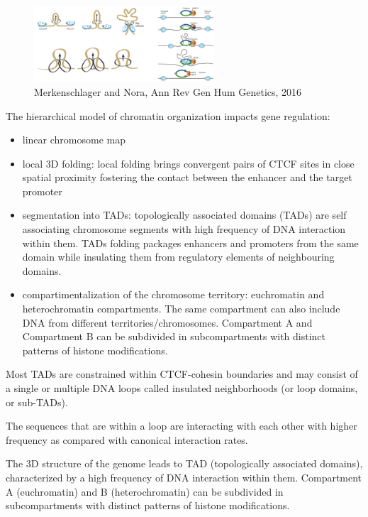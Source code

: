 \begin{figure}
\centering
\includegraphics[width=0.6\textwidth]{../_resources/Screenshot_2022-10-14_at_19-52-56.png}
\caption{Merkenschlager and Nora, Ann Rev Gen Hum Genetics, 2016}
\end{figure}

The hierarchical model of chromatin organization impacts gene regulation:
\begin{itemize}
\tightlist
\item
  linear chromosome map
\item
  local 3D folding: local folding brings convergent pairs of CTCF sites in close spatial proximity fostering the contact between the enhancer and the target promoter
\item
  segmentation into TADs: topologically associated domains (TADs) are self associating chromosome segments with high frequency of DNA interaction within them. TADs folding packages enhancers and promoters from the same domain while insulating them from regulatory elements of neighbouring domains.
\item
  compartimentalization of the chromosome territory: euchromatin and heterochromatin compartments. The same compartment can also include DNA from different territories/chromosomes. Compartment A and Compartment B can be subdivided in subcompartments with distinct patterns of histone modifications.
\end{itemize}

Most TADs are constrained within CTCF-cohesin boundaries and may consist of a single or multiple DNA loops called insulated neighborhoods (or loop domains, or sub-TADs).

The sequences that are within a loop are interacting with each other with higher frequency as compared with canonical interaction rates.

The 3D structure of the genome leads to TAD (topologically associated domains), characterized by a high frequency of DNA interaction within them. Compartment A (euchromatin) and B (heterochromatin) can be subdivided in subcompartments with distinct patterns of histone modifications.

